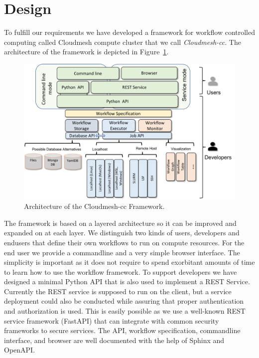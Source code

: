 
\section{Design}

To fulfill our requirements we have developed a framework for workflow
controlled computing called Cloudmesh compute cluster that we call
{\em Cloudmesh-cc}. The architecture of the framework is depicted in
Figure~\ref{fig:arch}.

\begin{figure}[htb]
\centering
\includegraphics[width=1.0\columnwidth]{images/cloudmesh-cc-arch.pdf}
\caption{Architecture of the Cloudmesh-cc Framework.}\label{fig:arch}
\end{figure}

The framework is based on a layered architecture so it can be improved
and expanded on at each layer. We distinguish two kinds of users,
developers and endusers that define their own workflows to run on
compute resources. For the end user we provide a commandline and a
very simple browser interface. The simplicity is important as it does
not require to spend exorbitant amounts of time to learn how to use
the workflow framework. To support developers we have designed a
minimal Python API that is also used to implement a REST Service.
Currently the REST service is supposed to run on the client, but a
service deployment could also be conducted while assuring that proper
authentication and authorization is used. This is easily possible as
we use a well-known REST service framework (FastAPI) that can integrate
with common security frameworks to secure services. The API, workflow
specification, commandline interface, and browser are well documented
with the help of Sphinx and OpenAPI.

